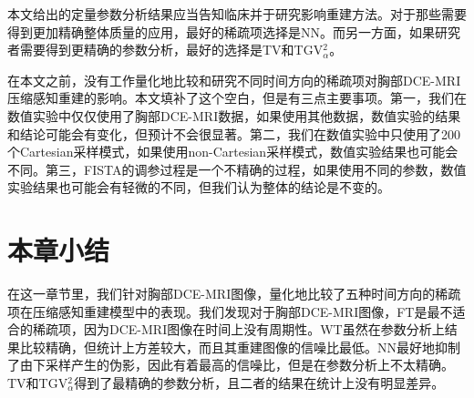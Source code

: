 本文给出的定量参数分析结果应当告知临床并于研究影响重建方法。对于那些需要得到更加精确整体质量的应用，最好的稀疏项选择是NN。而另一方面，如果研究者需要得到更精确的参数分析，最好的选择是TV和TGV$_{\alpha}^2$。

在本文之前，没有工作量化地比较和研究不同时间方向的稀疏项对胸部DCE-MRI压缩感知重建的影响。本文填补了这个空白，但是有三点主要事项。第一，我们在数值实验中仅仅使用了胸部DCE-MRI数据，如果使用其他数据，数值实验的结果和结论可能会有变化，但预计不会很显著。第二，我们在数值实验中只使用了200个Cartesian采样模式，如果使用non-Cartesian采样模式，数值实验结果也可能会不同。第三，FISTA的调参过程是一个不精确的过程，如果使用不同的参数，数值实验结果也可能会有轻微的不同，但我们认为整体的结论是不变的。

\section{本章小结}
在这一章节里，我们针对胸部DCE-MRI图像，量化地比较了五种时间方向的稀疏项在压缩感知重建模型中的表现。我们发现对于胸部DCE-MRI图像，FT是最不适合的稀疏项，因为DCE-MRI图像在时间上没有周期性。WT虽然在参数分析上结果比较精确，但统计上方差较大，而且其重建图像的信噪比最低。NN最好地抑制了由下采样产生的伪影，因此有着最高的信噪比，但是在参数分析上不太精确。TV和TGV$_{\alpha}^2$得到了最精确的参数分析，且二者的结果在统计上没有明显差异。



